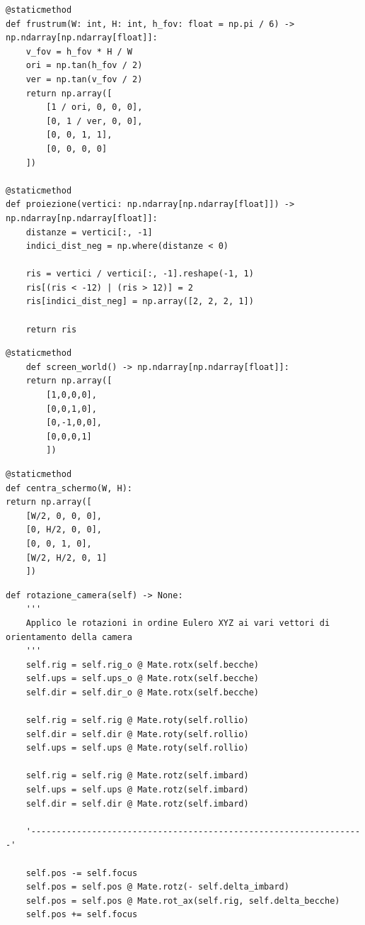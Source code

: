 \documentclass{article}
\begin{document}
\begin{lstlisting}[style=Pythonstyle, caption={Matrici di applicazione prospettiva}]
@staticmethod
def frustrum(W: int, H: int, h_fov: float = np.pi / 6) -> np.ndarray[np.ndarray[float]]:
	v_fov = h_fov * H / W
	ori = np.tan(h_fov / 2)
	ver = np.tan(v_fov / 2)
	return np.array([
		[1 / ori, 0, 0, 0],
		[0, 1 / ver, 0, 0],
		[0, 0, 1, 1],
		[0, 0, 0, 0]
	])

@staticmethod
def proiezione(vertici: np.ndarray[np.ndarray[float]]) -> np.ndarray[np.ndarray[float]]:
	distanze = vertici[:, -1]
	indici_dist_neg = np.where(distanze < 0)

	ris = vertici / vertici[:, -1].reshape(-1, 1)
	ris[(ris < -12) | (ris > 12)] = 2
	ris[indici_dist_neg] = np.array([2, 2, 2, 1])

	return ris
\end{lstlisting}


\begin{lstlisting}[style=Pythonstyle, caption={Matrice di cambio sistema di riferimento (schermo)}]
	@staticmethod
	def screen_world() -> np.ndarray[np.ndarray[float]]:
	return np.array([
		[1,0,0,0],
		[0,0,1,0],
		[0,-1,0,0],
		[0,0,0,1]
		])
\end{lstlisting}
	
\begin{lstlisting}[style=Pythonstyle, caption={Matrice di adattamento spazio normalizzato a dimensione dello schermo in px}]
@staticmethod
def centra_schermo(W, H):
return np.array([
	[W/2, 0, 0, 0],
	[0, H/2, 0, 0],
	[0, 0, 1, 0],
	[W/2, H/2, 0, 1]
	])
\end{lstlisting}

\newpage

\begin{lstlisting}[style=Pythonstyle, caption={prima e seconda parte dell'aggiornamento degli attributi della camera}]
def rotazione_camera(self) -> None:
	'''
	Applico le rotazioni in ordine Eulero XYZ ai vari vettori di orientamento della camera
	'''
	self.rig = self.rig_o @ Mate.rotx(self.becche)
	self.ups = self.ups_o @ Mate.rotx(self.becche)
	self.dir = self.dir_o @ Mate.rotx(self.becche)

	self.rig = self.rig @ Mate.roty(self.rollio)
	self.dir = self.dir @ Mate.roty(self.rollio)
	self.ups = self.ups @ Mate.roty(self.rollio)

	self.rig = self.rig @ Mate.rotz(self.imbard)
	self.ups = self.ups @ Mate.rotz(self.imbard)
	self.dir = self.dir @ Mate.rotz(self.imbard)

	'------------------------------------------------------------------'

	self.pos -= self.focus
	self.pos = self.pos @ Mate.rotz(- self.delta_imbard)
	self.pos = self.pos @ Mate.rot_ax(self.rig, self.delta_becche)
	self.pos += self.focus
\end{lstlisting}
\end{document}
